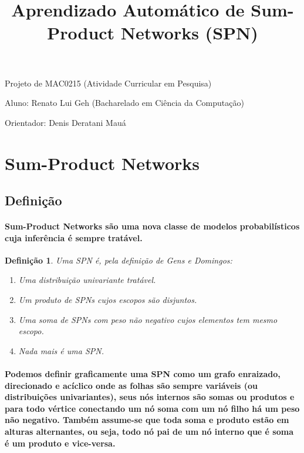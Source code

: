 \documentclass[a4paper,10pt]{article}
\title{\textbf{Aprendizado Automático de Sum-Product Networks (SPN)}}
\theoremstyle{plain}
\newtheorem*{spn-def}{Definição}
\begin{document}
\date{}
\author{}
\vspace*{-40pt}
{\let\newpage\relax\maketitle}

Projeto de MAC0215 (Atividade Curricular em Pesquisa)

Aluno: Renato Lui Geh (Bacharelado em Ciência da Computação)

Orientador: Denis Deratani Mauá

\section{Sum-Product Networks}
\subsection{Definição}

\paragraph{
  Sum-Product Networks são uma nova classe de modelos probabilísticos cuja inferência é sempre
tratável.
}

\begin{spn-def} Uma SPN é, pela definição de Gens e Domingos\cite{gens-domingos}:

\begin{enumerate} \itemsep0pt
  \item Uma distribuição univariante tratável.
  \item Um produto de SPNs cujos escopos são disjuntos.
  \item Uma soma de SPNs com peso não negativo cujos elementos tem mesmo escopo.
  \item Nada mais é uma SPN.
\end{enumerate}
\end{spn-def}

\paragraph{
  Podemos definir graficamente uma SPN como um grafo enraizado, direcionado e acíclico onde as 
folhas são sempre variáveis (ou distribuições univariantes), seus nós internos são somas ou 
produtos e para todo vértice conectando um nó soma com um nó filho há um peso não negativo. 
Também assume-se que toda soma e produto estão em alturas alternantes, ou seja, todo nó pai 
de um nó interno que é soma é um produto e vice-versa.
}
\end{document}
